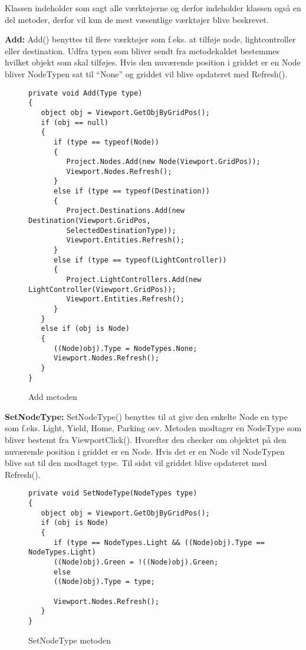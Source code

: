 \vspace{5mm}

Klassen indeholder som sagt alle værktøjerne og derfor indeholder klassen også en del metoder, derfor vil kun de mest væsentlige værktøjer blive beskrevet.

\vspace{5mm}

\textbf{Add:} \newline
Add() benyttes til flere værktøjer som f.eks. at tilføje node, lightcontroller eller destination. Udfra typen som bliver sendt fra metodekaldet bestemmes hvilket objekt som skal tilføjes. Hvis den nuværende position i griddet er en Node bliver NodeTypen sat til “None” og griddet vil blive opdateret med Refresh(). 

\begin{figure}[H]
\begin{lstlisting}
private void Add(Type type)
{
   object obj = Viewport.GetObjByGridPos();
   if (obj == null)
   {
      if (type == typeof(Node))
      {
         Project.Nodes.Add(new Node(Viewport.GridPos));
         Viewport.Nodes.Refresh();
      }
      else if (type == typeof(Destination))
      {
         Project.Destinations.Add(new Destination(Viewport.GridPos,  
		 SelectedDestinationType));
         Viewport.Entities.Refresh();
      }
      else if (type == typeof(LightController))
      {
         Project.LightControllers.Add(new LightController(Viewport.GridPos));
         Viewport.Entities.Refresh();
      }
   }
   else if (obj is Node)
   {
      ((Node)obj).Type = NodeTypes.None;
      Viewport.Nodes.Refresh();
   }
}
\end{lstlisting}
\caption{Add metoden}\label{AddCode}
\end{figure}

\vspace{5mm}

\textbf{SetNodeType:} \newline
SetNodeType() benyttes til at give den enkelte Node en type som f.eks. Light, Yield, Home, Parking osv. Metoden modtager en NodeType som bliver bestemt fra ViewportClick(). Hvorefter den checker om objektet på den nuværende position i griddet er en Node. Hvis det er en Node vil NodeTypen blive sat til den modtaget type. Til sidst vil griddet blive opdateret med Refresh().

\begin{figure}[H]
\begin{lstlisting}
private void SetNodeType(NodeTypes type)
{
   object obj = Viewport.GetObjByGridPos();
   if (obj is Node)
   {
      if (type == NodeTypes.Light && ((Node)obj).Type == NodeTypes.Light)
      ((Node)obj).Green = !((Node)obj).Green;
      else
      ((Node)obj).Type = type;

      Viewport.Nodes.Refresh();
   }
}
\end{lstlisting}
\caption{SetNodeType metoden}\label{SetNodeTypeCode}
\end{figure}

